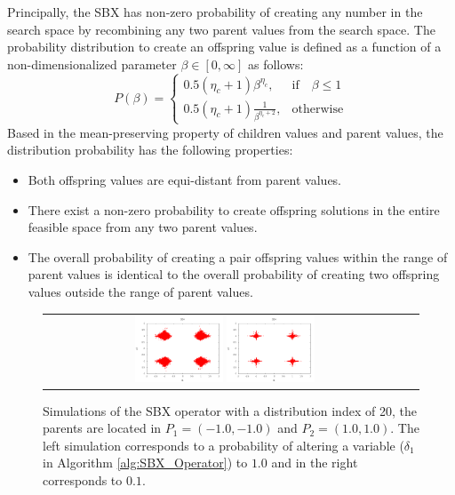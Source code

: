 Principally, the SBX has non-zero probability of creating any number in the search space by recombining any two parent values from the search space.
%
The probability distribution to create an offspring value is defined as a function of a non-dimensionalized parameter $\beta \in [0, \infty]$ as follows:
%
\begin{equation}
    P(\beta)= 
\begin{cases}
     0.5(\eta_c + 1)\beta^{\eta_c},& \text{if} \quad \beta \leq 1\\
     0.5(\eta_c + 1) \frac{1}{\beta^{\eta_c + 2}} ,& \text{otherwise}
\end{cases}
\end{equation}
%
Based in the mean-preserving property of children values and parent values, the distribution probability has the following properties:
\begin{itemize}
\item Both offspring values are equi-distant from parent values.
\item There exist a non-zero probability to create offspring solutions in the entire feasible space  from any two parent values.
\item The overall probability of creating a pair offspring values within the range of parent values is identical to the overall probability of creating two offspring values outside  the range of parent values.
\end{itemize}

\begin{figure}[t]
\centering
\begin{tabular}{cc}
   \includegraphics[width=0.25\textwidth]{img/SBX_eta_20_2D_pv_1.png} 
   \includegraphics[width=0.25\textwidth]{img/SBX_eta_20_2D_pv_01.png} 
\end{tabular}
\caption{Simulations of the SBX operator with a distribution index of 20, the parents are located in $P_1=(-1.0, -1.0)$ and $P_2=(1.0, 1.0)$. The left simulation corresponds to a probability of altering a variable ($\delta_1$ in Algorithm \ref{alg:SBX_Operator}) to $1.0$ and in the right corresponds to $0.1$.}
\label{fig:Simulation_pv}
\end{figure}






